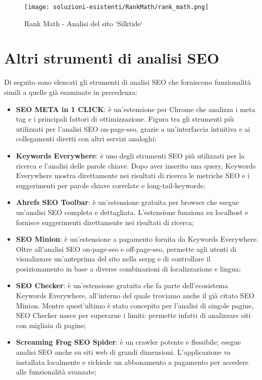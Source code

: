 \begin{figure}[H]
    \centering 
    \texttt{[image: soluzioni-esistenti/RankMath/rank\_math.png]} 
    \caption{Rank Math - Analisi del sito `Silktide`}
\end{figure}

\section{Altri strumenti di analisi SEO}

\par Di seguito sono elencati gli strumenti di analisi SEO che forniscono funzionalità simili a quelle già esaminate in precedenza:
\begin{itemize}
    \item \textbf{SEO META in 1 CLICK}: è un'estensione per Chrome che analizza i meta tag e i principali fattori di ottimizzazione. Figura tra gli strumenti più utilizzati per l'analisi SEO \gls{on-page-seo}, grazie a un'interfaccia intuitiva e ai collegamenti diretti con altri servizi analoghi;
    \item \textbf{Keywords Everywhere}: è uno degli strumenti SEO più utilizzati per la ricerca e l'analisi delle parole chiave. Dopo aver inserito una query, Keywords Everywhere mostra direttamente nei risultati di ricerca le metriche SEO e i suggerimenti per parole chiave correlate e \gls{long-tail-keywords};
    \item \textbf{Ahrefs SEO Toolbar}: è un'estensione gratuita per browser che esegue un'analisi SEO completa e dettagliata. L'estensione funziona su \gls{localhost} e fornisce suggerimenti direttamente nei risultati di ricerca;
    \item \textbf{SEO Minion}: è un'estensione a pagamento fornita da Keywords Everywhere. Oltre all'analisi SEO \gls{on-page-seo} e \gls{off-page-seo}, permette agli utenti di visualizzare un'anteprima del sito nella \gls{serpg} e di controllare il posizionamento in base a diverse combinazioni di localizzazione e lingua;
    \item \textbf{SEO Checker}: è un'estensione gratuita che fa parte dell'ecosistema Keywords Everywhere, all'interno del quale troviamo anche il già citato SEO Minion. Mentre quest'ultimo è stato concepito per l'analisi di singole pagine, SEO Checker nasce per superarne i limiti: permette infatti di analizzare siti con migliaia di pagine; 
    \item \textbf{Screaming Frog SEO Spider}: è un crawler potente e flessibile; esegue analisi SEO anche su siti web di grandi dimensioni. L'applicazione va installata localmente e richiede un abbonamento a pagamento per accedere alle funzionalità avanzate;

\end{itemize}
